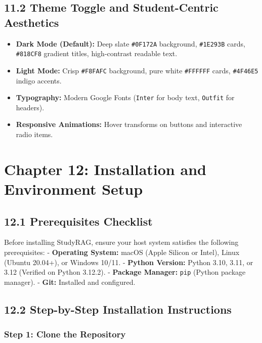 \documentclass[
]{article}
\providecommand{\tightlist}{%
  \setlength{\itemsep}{0pt}\setlength{\parskip}{0pt}}
\begin{document}
\subsection{11.2 Theme Toggle and Student-Centric
Aesthetics}\label{theme-toggle-and-student-centric-aesthetics}

\begin{itemize}
\tightlist
\item
  \textbf{Dark Mode (Default):} Deep slate \texttt{\#0F172A} background,
  \texttt{\#1E293B} cards, \texttt{\#818CF8} gradient titles,
  high-contrast readable text.
\item
  \textbf{Light Mode:} Crisp \texttt{\#F8FAFC} background, pure white
  \texttt{\#FFFFFF} cards, \texttt{\#4F46E5} indigo accents.
\item
  \textbf{Typography:} Modern Google Fonts (\texttt{Inter} for body
  text, \texttt{Outfit} for headers).
\item
  \textbf{Responsive Animations:} Hover transforms on buttons and
  interactive radio items.
\end{itemize}

\section{Chapter 12: Installation and Environment
Setup}\label{chapter-12-installation-and-environment-setup}

\subsection{12.1 Prerequisites Checklist}\label{prerequisites-checklist}

Before installing StudyRAG, ensure your host system satisfies the
following prerequisites: - \textbf{Operating System:} macOS (Apple
Silicon or Intel), Linux (Ubuntu 20.04+), or Windows 10/11. -
\textbf{Python Version:} Python 3.10, 3.11, or 3.12 (Verified on Python
3.12.2). - \textbf{Package Manager:} \texttt{pip} (Python package
manager). - \textbf{Git:} Installed and configured.

\subsection{12.2 Step-by-Step Installation
Instructions}\label{step-by-step-installation-instructions}

\subsubsection{Step 1: Clone the
Repository}\label{step-1-clone-the-repository}
\end{document}
